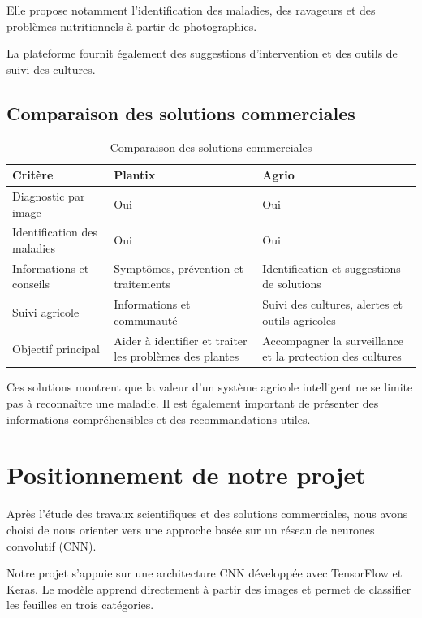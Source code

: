 \documentclass[12pt,a4paper,oneside]{report}
\begin{document}
Elle propose notamment l'identification des maladies,
des ravageurs et des problèmes nutritionnels à partir
de photographies.

La plateforme fournit également des suggestions
d'intervention et des outils de suivi des cultures.

\subsection{Comparaison des solutions commerciales}

\begin{table}[H]
\centering
\caption{Comparaison des solutions commerciales}
\begin{tabularx}{\textwidth}{p{2.5cm}X X}
\toprule
\textbf{Critère} & \textbf{Plantix} & \textbf{Agrio}\\
\midrule
Diagnostic par image &
Oui &
Oui\\

Identification des maladies &
Oui &
Oui\\

Informations et conseils &
Symptômes, prévention et traitements &
Identification et suggestions de solutions\\

Suivi agricole &
Informations et communauté &
Suivi des cultures, alertes et outils agricoles\\

Objectif principal &
Aider à identifier et traiter les problèmes des plantes &
Accompagner la surveillance et la protection des cultures\\
\bottomrule
\end{tabularx}
\end{table}

Ces solutions montrent que la valeur d'un système agricole
intelligent ne se limite pas à reconnaître une maladie.
Il est également important de présenter des informations
compréhensibles et des recommandations utiles.

\section{Positionnement de notre projet}

Après l'étude des travaux scientifiques et des solutions
commerciales, nous avons choisi de nous orienter vers
une approche basée sur un réseau de neurones convolutif
(CNN).

Notre projet s'appuie sur une architecture CNN développée
avec TensorFlow et Keras. Le modèle apprend directement
à partir des images et permet de classifier les feuilles
en trois catégories.
\end{document}
